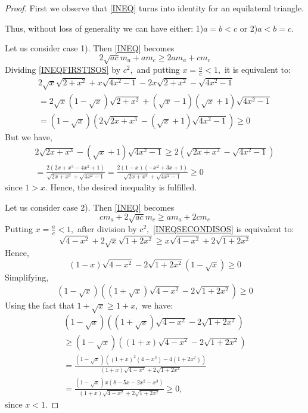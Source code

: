 \documentclass[10pt,a4paper]{amsart}
\begin{document}
\begin{proof} First we observe that \eqref{INEQ} turns into identity for an equilateral triangle. 

Thus, without loss of generality we can have either: 1)$a=b<c$ or 2)$a<b=c.$

Let us consider case 1). Then \eqref{INEQ} becomes
\begin{equation}\label{INEQFIRSTISOS}
2\sqrt{ac} m_a+a m_c \geq 2 a m_a+c m_c 
\end{equation}
Dividing \eqref{INEQFIRSTISOS} by $c^2,$ and putting $x=\frac{a}{c}<1,$ it is equivalent to:
\begin{align*}
2 \sqrt{x} \sqrt{2+x^2}+x\sqrt{4x^2-1} - 2x \sqrt{2+x^2}- \sqrt{4x^2-1} \\
= 2\sqrt{x}(1-\sqrt{x})\sqrt{2+x^2}+(\sqrt{x}-1)(\sqrt{x}+1)\sqrt{4x^2-1} \\
=(1-\sqrt{x})(2\sqrt{2x+x^3}-(\sqrt{x}+1)\sqrt{4x^2-1}) \geq 0
\end{align*}
But we have,
\begin{align*}
2\sqrt{2x+x^3}-(\sqrt{x}+1)\sqrt{4x^2-1} \geq 2(\sqrt{2x+x^3}-\sqrt{4x^2-1})\\
=\frac{2({2x+x^3}-{4x^2+1})}{\sqrt{2x+x^3}+\sqrt{4x^2-1}}=\frac{2(1-x)(-x^2+3x+1)}{\sqrt{2x+x^3}+\sqrt{4x^2-1}} \geq 0
\end{align*}
since $1>x.$ Hence, the desired inequality is fulfilled.



Let us consider case 2). Then \eqref{INEQ} becomes
\begin{equation}\label{INEQSECONDISOS}
c  m_a+2\sqrt{ac} m_c \geq a m_a+2 c m_c 
\end{equation}
Putting $x=\frac{a}{c}<1,$ after division by $c^2,$ \eqref{INEQSECONDISOS} is equivalent to:
\[
\sqrt{4-x^2}+2\sqrt{x}\sqrt{1+2x^2} \geq x\sqrt{4-x^2}+2\sqrt{1+2x^2}
\]
Hence, 
\[
(1- x)\sqrt{4-x^2}-2\sqrt{1+2x^2}(1-\sqrt{x})\geq 0
\]
Simplifying,
\[
(1-\sqrt{x})\left((1+\sqrt{x})\sqrt{4-x^2}-2\sqrt{1+2x^2}\right)\geq 0
\]
Using the fact that $1+\sqrt{x} \geq 1+x,$ we have:
\begin{align*}
(1-\sqrt{x})\left((1+\sqrt{x})\sqrt{4-x^2}-2\sqrt{1+2x^2}\right)\\
\geq (1-\sqrt{x})\left((1+x)\sqrt{4-x^2}-2\sqrt{1+2x^2}\right)\\
=\frac{(1-\sqrt{x})\left((1+x)^2(4-x^2)-4(1+2x^2)\right)}{(1+x)\sqrt{4-x^2}+2\sqrt{1+2x^2}} \\
=\frac{(1-\sqrt{x})x\left(8-5x-2x^2-x^3\right)}{(1+x)\sqrt{4-x^2}+2\sqrt{1+2x^2}}  \geq 0,
\end{align*}
since $x<1.$
\end{proof}
\end{document}
